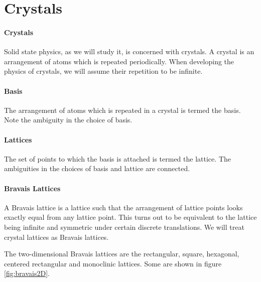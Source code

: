 \section{Crystals}

\paragraph{Crystals}
Solid state physics, as we will study it, is concerned with crystals. A crystal is an arrangement of atoms which is repeated periodically. When developing the physics of crystals, we will assume their repetition to be infinite.

\paragraph{Basis}
The arrangement of atoms which is repeated in a crystal is termed the basis. Note the ambiguity in the choice of basis.

\paragraph{Lattices}
The set of points to which the basis is attached is termed the lattice. The ambiguities in the choices of basis and lattice are connected.

\paragraph{Bravais Lattices}
A Bravais lattice is a lattice such that the arrangement of lattice points looks exactly equal from any lattice point. This turns out to be equivalent to the lattice being infinite and symmetric under certain discrete translations. We will treat crystal lattices as Bravais lattices.

The two-dimensional Bravais lattices are the rectangular, square, hexagonal, centered rectangular and monoclinic lattices. Some are shown in figure \ref{fig:bravais2D}.

